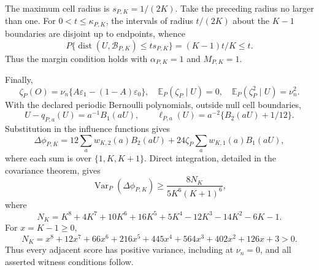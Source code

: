 The maximum cell radius is \(s_{P,K}=1/(2K)\).  Take the preceding radius no larger than one.  For \(0<t\leq\kappa_{P,K}\), the intervals of radius \(t/(2K)\) about the \(K-1\) boundaries are disjoint up to endpoints, whence
\[
 P\{\operatorname{dist}(U,\mathcal B_{P,K})\leq ts_{P,K}\}
 =(K-1)t/K\leq t.
\]
Thus the margin condition holds with \(\alpha_{P,K}=1\) and \(M_{P,K}=1\).

Finally,
\[
 \zeta_P(O)=\nu_n\{A\varepsilon_1-(1-A)\varepsilon_0\},\quad
 \mathbb E_P(\zeta_P\mid U)=0,\quad
 \mathbb E_P(\zeta_P^2\mid U)=\nu_n^2.
\]
With the declared periodic Bernoulli polynomials, outside null cell boundaries,
\[
 U-q_{P,a}(U)=a^{-1}B_1(aU),\qquad
 \ell_{P,a}(U)=a^{-2}\{B_2(aU)+1/12\}.
\]
Substitution in the influence functions gives
\[
 \Delta\phi_{P,K}
 =12\sum_aw_{K,2}(a)B_2(aU)
 +24\zeta_P\sum_aw_{K,1}(a)B_1(aU),
\]
where each sum is over \(\{1,K,K+1\}\).  Direct integration, detailed in the covariance theorem, gives
\[
 \operatorname{Var}_P(\Delta\phi_{P,K})\geq
 \frac{8N_K}{5K^6(K+1)^6},
\]
where
\[
 N_K=K^8+4K^7+10K^6+16K^5+5K^4-12K^3-14K^2-6K-1.
\]
For \(x=K-1\geq0\),
\[
 N_K=x^8+12x^7+66x^6+216x^5+445x^4+564x^3+402x^2+126x+3>0.
\]
Thus every adjacent score has positive variance, including at \(\nu_n=0\), and all asserted witness conditions follow.